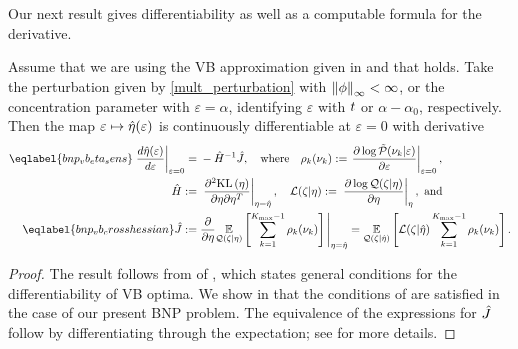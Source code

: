 Our next result gives differentiability as well as a computable formula for the
derivative.
%
\begin{thm}
%
Assume that we are using the VB approximation given in  and
that  holds.  Take the perturbation given by
\eqref{mult_perturbation} with $\left\Vert\phi\right\Vert_{\infty} < \infty$, or the concentration
parameter with $\varepsilon = \alpha$, identifying $\varepsilon$ with $t$ or
$\alpha - \alpha_0$, respectively.  Then the map $\varepsilon \mapsto
\hat\eta(\varepsilon)$ is continuously differentiable at $\varepsilon = 0$ with
derivative
%
\begin{align}
%
\eqlabel{bnp_vb_eta_sens}
\fracat{d \etaopt(\varepsilon)}{d \varepsilon}{\varepsilon=0} ={}&
    - \hessopt^{-1} \crosshessian, \mathwhere
    \rho_\k(\nuk) := \fracat{\partial \log \ptil(\nu_k \vert \varepsilon)}
            {\partial \varepsilon}{\varepsilon=0}
            ,
\\
%
\hessopt :={}& \fracat{\partial^2 \KL{\eta}}
                      {\partial \eta \partial \eta^T}
                      {\eta = \etaopt},
\quad \lqgradbar{\zeta \vert \eta} :={}
\fracat{\partial \log \q(\zeta \vert \eta)}{\partial \eta}{\eta}, \textrm{ and}\\
%
\eqlabel{bnp_vb_crosshessian}
\crosshessian :={}&
    \frac{\partial}{\partial\eta}
    \expect{\q(\zeta \vert \eta)}{
        \sum_{k=1}^{\kmax-1}
        \rho_\k(\nuk)
    }
    \Bigg|_{\eta = \etaopt}
={}
    \expect{\q(\zeta \vert \etaopt)}{
          \lqgradbar{\zeta \vert \etaopt}
          \sum_{k=1}^{\kmax-1}
          \rho_\k(\nuk)}.
%
\end{align}
%
\end{thm}
%
\begin{proof}
%
The result follows from  of ,
which states general conditions for the differentiability of VB optima.  We show
in  that the conditions
of  are satisfied in the case of our present BNP problem. The
equivalence of the expressions for $\hat J$ follow by differentiating
through the expectation; see  for more details.
%
\end{proof}
%

